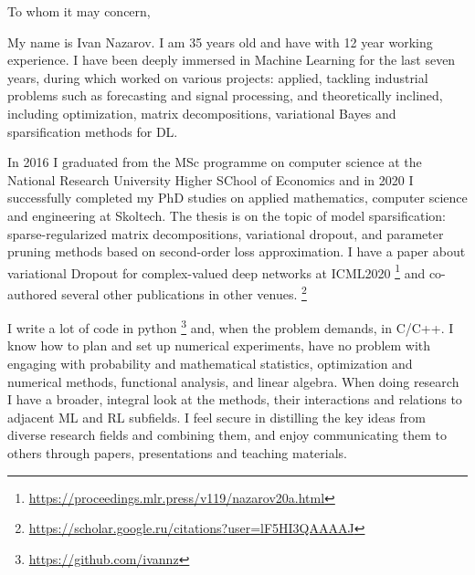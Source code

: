 \documentclass[14pt]{letter}
\begin{document}
\thispagestyle{empty}

%

\vspace{1.5cm}

\begin{minipage}{0.5\linewidth}
To whom it may concern, \par
\end{minipage} \par\bigskip

My name is Ivan Nazarov. I am 35 years old and have with 12 year working experience. I have
been deeply immersed in Machine Learning for the last seven years, during which worked on
various projects: applied, tackling industrial problems such as forecasting and signal processing,
and theoretically inclined, including optimization, matrix decompositions, variational Bayes
and sparsification methods for DL. \par\medskip

In 2016 I graduated from the MSc programme on computer science at the National Research
University Higher SChool of Economics and in 2020 I successfully completed my PhD studies
on applied mathematics, computer science and engineering at Skoltech. The thesis is on
the topic of model sparsification: sparse-regularized matrix decompositions, variational
dropout, and parameter pruning methods based on second-order loss approximation. I have
a paper about variational Dropout for complex-valued deep networks at ICML2020%
\footnote{
    \url{https://proceedings.mlr.press/v119/nazarov20a.html}
} and co-authored several other publications in other venues.%
\footnote{
    \url{https://scholar.google.ru/citations?user=lF5HI3QAAAAJ}
}
\par\medskip

I write a lot of code in python%
\footnote{
    \url{https://github.com/ivannz}
}
and, when the problem demands, in C/C++. I know how to plan and set up numerical experiments,
have no problem with engaging with probability and mathematical statistics, optimization and
numerical methods, functional analysis, and linear algebra. When doing research I have a broader,
integral look at the methods, their interactions and relations to adjacent ML and RL subfields.
I feel secure in distilling the key ideas from diverse research fields and combining them,
and enjoy communicating them to others through papers, presentations and teaching materials.
\par\medskip
\end{document}
